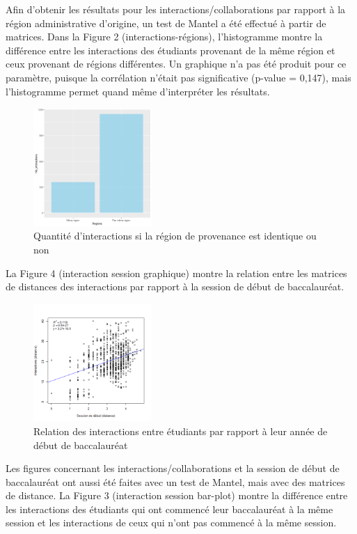 \documentclass[9pt,twocolumn,twoside,]{pnas-new}
\begin{document}
Afin d'obtenir les résultats pour les interactions/collaborations par
rapport à la région administrative d'origine, un test de Mantel a été
effectué à partir de matrices. Dans la Figure 2 (interactions-régions),
l'histogramme montre la différence entre les interactions des étudiants
provenant de la même région et ceux provenant de régions différentes. Un
graphique n'a pas été produit pour ce paramètre, puisque la corrélation
n'était pas significative (p-value = 0,147), mais l'histogramme permet
quand même d'interpréter les résultats.

\begin{figure}
\centering
\includegraphics[width=0.4\textwidth,height=0.3\textheight]{"../region.png"}
\caption{Quantité d'interactions si la région de provenance est
identique ou non}
\end{figure}

La Figure 4 (interaction session graphique) montre la relation entre les
matrices de distances des interactions par rapport à la session de début
de baccalauréat.

\begin{figure}
\centering
\includegraphics[width=0.4\textwidth,height=0.3\textheight]{"../plot.png"}
\caption{Relation des interactions entre étudiants par rapport à leur
année de début de baccalauréat}
\end{figure}

Les figures concernant les interactions/collaborations et la session de
début de baccalauréat ont aussi été faites avec un test de Mantel, mais
avec des matrices de distance. La Figure 3 (interaction session
bar-plot) montre la différence entre les interactions des étudiants qui
ont commencé leur baccalauréat à la même session et les interactions de
ceux qui n'ont pas commencé à la même session.
\end{document}
